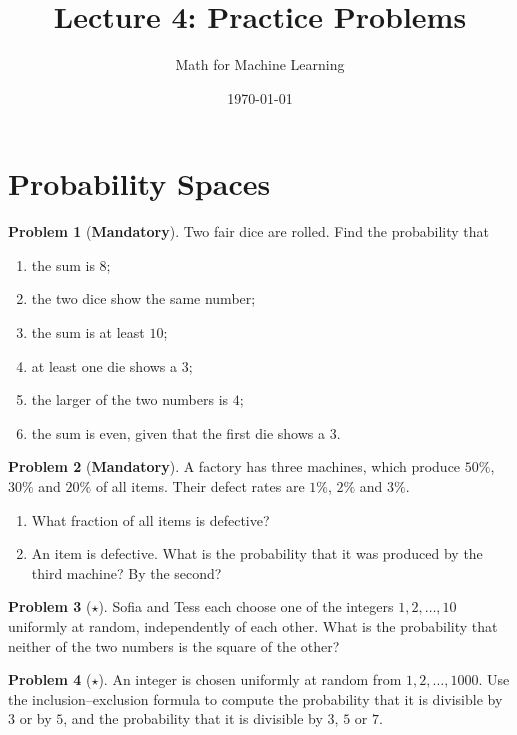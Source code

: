 \documentclass[11pt]{article}
\title{Lecture 4: Practice Problems}
\author{Math for Machine Learning}
\date{\today}
\theoremstyle{definition}
\newtheorem{problem}{Problem}[section]
\newcommand{\mandatory}{\textcolor{red!70!black}{\textbf{Mandatory}}}
\begin{document}
\maketitle

\section{Probability Spaces}

\begin{problem}[\mandatory]\label{pr:dice}
    Two fair dice are rolled. Find the probability that
    \begin{enumerate}[label=(\alph*)]
        \item the sum is $8$;
        \item the two dice show the same number;
        \item the sum is at least $10$;
        \item at least one die shows a $3$;
        \item the larger of the two numbers is $4$;
        \item the sum is even, given that the first die shows a $3$.
    \end{enumerate}
\end{problem}

\begin{problem}[\mandatory]\label{pr:machines}
    A factory has three machines, which produce $50\%$, $30\%$ and $20\%$ of all items. Their defect rates are $1\%$, $2\%$ and $3\%$.
    \begin{enumerate}[label=(\alph*)]
        \item What fraction of all items is defective?
        \item An item is defective. What is the probability that it was produced by the third machine? By the second?
    \end{enumerate}
\end{problem}

\begin{problem}[$\star$]\label{pr:squares}
    Sofia and Tess each choose one of the integers $1, 2, \ldots, 10$ uniformly at random, independently of each other. What is the probability that neither of the two numbers is the square of the other?
\end{problem}

\begin{problem}[$\star$]\label{pr:divisible}
    An integer is chosen uniformly at random from $1, 2, \ldots, 1000$. Use the inclusion--exclusion formula to compute the probability that it is divisible by $3$ or by $5$, and the probability that it is divisible by $3$, $5$ or $7$.
\end{problem}
\end{document}
